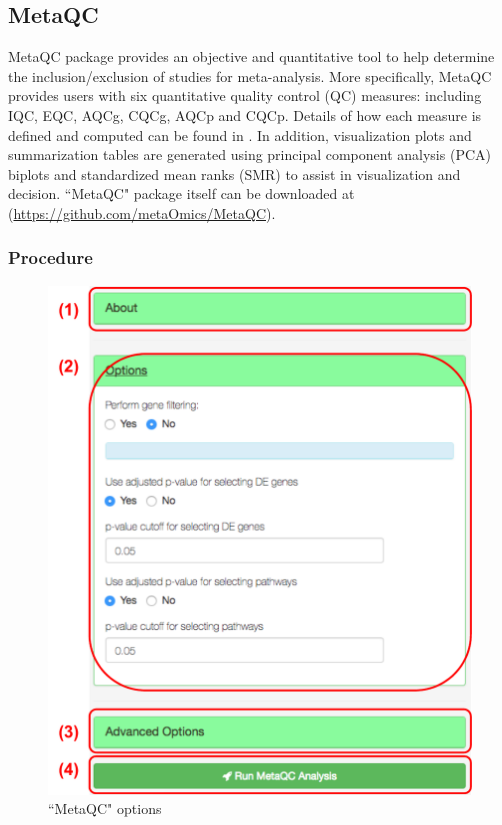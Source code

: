 \subsection{MetaQC}
MetaQC package provides an objective and quantitative tool to help determine the inclusion/exclusion of studies for meta-analysis. More specifically, MetaQC provides users with six quantitative quality control (QC) measures: including IQC, EQC, AQCg, CQCg, AQCp and CQCp. Details of how each measure is defined and computed can be found in \cite{kang2012metaqc}. In addition, visualization plots and summarization tables are generated using principal component analysis (PCA) biplots and standardized mean ranks (SMR) to assist in visualization and decision. 
``MetaQC" package itself can be downloaded at (\url{https://github.com/metaOmics/MetaQC}). 
\subsubsection{Procedure}

\begin{figure}[H]
\begin{center}
\includegraphics[scale=0.5]{./figure/metaQC/metaQCoption.pdf}
\caption{``MetaQC" options}
\label{fig:MetaQCoption}
\end{center}
\end{figure}

